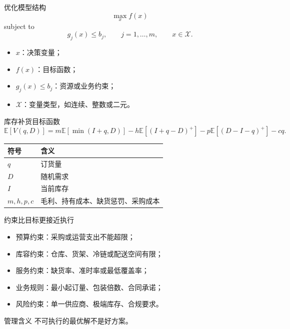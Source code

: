 \documentclass[UTF8,fontset=fandol,aspectratio=169,11pt]{ctexbeamer}
\begin{document}
\begin{frame}{优化模型结构}
\[
  \max_x f(x)
\]
subject to
\[
  g_j(x)\le b_j,\qquad j=1,\ldots,m,
  \qquad
  x\in\mathcal X.
\]
\begin{itemize}
  \item \(x\)：决策变量；
  \item \(f(x)\)：目标函数；
  \item \(g_j(x)\le b_j\)：资源或业务约束；
  \item \(\mathcal X\)：变量类型，如连续、整数或二元。
\end{itemize}
\end{frame}

\begin{frame}{库存补货目标函数}
\[
  \mathbb E[V(q,D)]
  =
  m\mathbb E[\min(I+q,D)]
  -
  h\mathbb E[(I+q-D)^+]
  -
  p\mathbb E[(D-I-q)^+]
  -
  cq.
\]
\begin{center}
\begin{tabular}{ll}
\toprule
符号 & 含义\\
\midrule
\(q\) & 订货量\\
\(D\) & 随机需求\\
\(I\) & 当前库存\\
\(m,h,p,c\) & 毛利、持有成本、缺货惩罚、采购成本\\
\bottomrule
\end{tabular}
\end{center}
\end{frame}

\begin{frame}{约束比目标更接近执行}
\begin{itemize}
  \item 预算约束：采购或运营支出不能超限；
  \item 库容约束：仓库、货架、冷链或配送空间有限；
  \item 服务约束：缺货率、准时率或最低覆盖率；
  \item 业务规则：最小起订量、包装倍数、合同承诺；
  \item 风险约束：单一供应商、极端库存、合规要求。
\end{itemize}
\begin{block}{管理含义}
不可执行的最优解不是好方案。
\end{block}
\end{frame}
\end{document}
